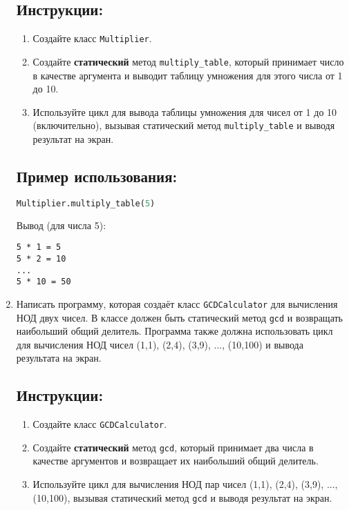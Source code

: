 \begin{enumerate}
\subsection*{Инструкции:}
\begin{enumerate}
    \item Создайте класс \texttt{Multiplier}.
    \item Создайте \textbf{статический} метод \texttt{multiply\_table}, который принимает число в качестве аргумента и выводит таблицу умножения для этого числа от 1 до 10.
    \item Используйте цикл для вывода таблицы умножения для чисел от 1 до 10 (включительно), вызывая статический метод \texttt{multiply\_table} и выводя результат на экран.
\end{enumerate}

\subsection*{Пример использования:}
\begin{lstlisting}[language=Python]
    Multiplier.multiply_table(5)
\end{lstlisting}
Вывод (для числа 5):
\begin{verbatim}
5 * 1 = 5
5 * 2 = 10
...
5 * 10 = 50
\end{verbatim}

\item
Написать программу, которая создаёт класс \texttt{GCDCalculator} 
для вычисления НОД двух чисел. В классе должен быть статический метод
\texttt{gcd} и возвращать наибольший общий делитель. 
Программа также должна использовать цикл для вычисления НОД чисел 
(1,1), (2,4), (3,9), ..., (10,100) и вывода результата на экран.

\subsection*{Инструкции:}
\begin{enumerate}
    \item Создайте класс \texttt{GCDCalculator}.
    \item Создайте \textbf{статический} метод \texttt{gcd}, который принимает два числа в качестве аргументов и возвращает их наибольший общий делитель.
    \item Используйте цикл для вычисления НОД пар чисел (1,1), (2,4), (3,9), ..., (10,100), вызывая статический метод \texttt{gcd} и выводя результат на экран.
\end{enumerate}


\end{enumerate}
